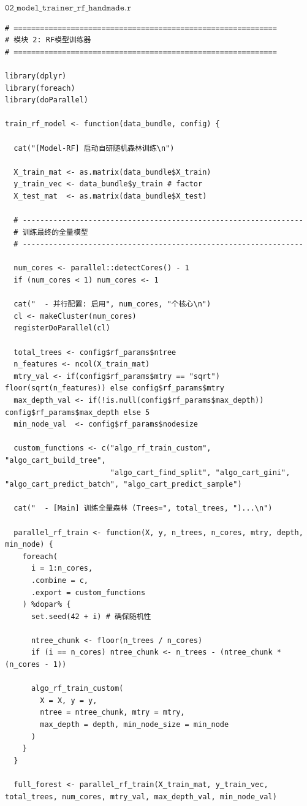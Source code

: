\documentclass[11pt, a4paper]{article}
\begin{document}
$\texttt{02\_model\_trainer\_rf\_handmade.r}$
\begin{verbatim}
# ============================================================
# 模块 2: RF模型训练器
# ============================================================

library(dplyr)
library(foreach)
library(doParallel)

train_rf_model <- function(data_bundle, config) {
  
  cat("[Model-RF] 启动自研随机森林训练\n")

  X_train_mat <- as.matrix(data_bundle$X_train)
  y_train_vec <- data_bundle$y_train # factor
  X_test_mat  <- as.matrix(data_bundle$X_test)
  
  # ----------------------------------------------------------------
  # 训练最终的全量模型
  # ----------------------------------------------------------------

  num_cores <- parallel::detectCores() - 1
  if (num_cores < 1) num_cores <- 1
  
  cat("  - 并行配置: 启用", num_cores, "个核心\n")
  cl <- makeCluster(num_cores)
  registerDoParallel(cl)
  
  total_trees <- config$rf_params$ntree
  n_features <- ncol(X_train_mat)
  mtry_val <- if(config$rf_params$mtry == "sqrt") floor(sqrt(n_features)) else config$rf_params$mtry
  max_depth_val <- if(!is.null(config$rf_params$max_depth)) config$rf_params$max_depth else 5
  min_node_val  <- config$rf_params$nodesize
  
  custom_functions <- c("algo_rf_train_custom", "algo_cart_build_tree", 
                        "algo_cart_find_split", "algo_cart_gini", "algo_cart_predict_batch", "algo_cart_predict_sample")
  
  cat("  - [Main] 训练全量森林 (Trees=", total_trees, ")...\n")
  
  parallel_rf_train <- function(X, y, n_trees, n_cores, mtry, depth, min_node) {
    foreach(
      i = 1:n_cores,
      .combine = c, 
      .export = custom_functions 
    ) %dopar% {
      set.seed(42 + i) # 确保随机性
      
      ntree_chunk <- floor(n_trees / n_cores)
      if (i == n_cores) ntree_chunk <- n_trees - (ntree_chunk * (n_cores - 1))
      
      algo_rf_train_custom(
        X = X, y = y,
        ntree = ntree_chunk, mtry = mtry,
        max_depth = depth, min_node_size = min_node
      )
    }
  }
  
  full_forest <- parallel_rf_train(X_train_mat, y_train_vec, total_trees, num_cores, mtry_val, max_depth_val, min_node_val)
  

\end{verbatim}
\end{document}

